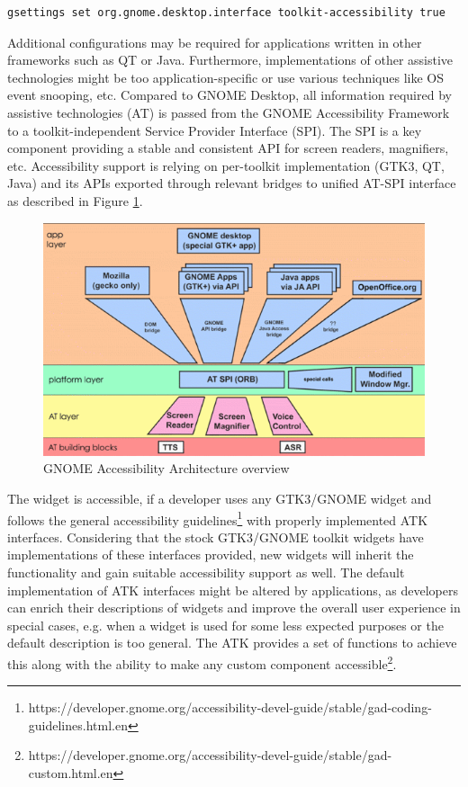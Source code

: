 \begin{lstlisting}[numbers=none,caption={Enabling accessibility via gsettings command},label={gsettings}]
gsettings set org.gnome.desktop.interface toolkit-accessibility true
\end{lstlisting}

Additional configurations may be required for applications written in other frameworks such as QT or Java. Furthermore, implementations of other assistive technologies might be too application-specific or use various techniques like OS event snooping, etc. Compared to GNOME Desktop, all information required by assistive technologies (AT) is passed from the GNOME Accessibility Framework to a toolkit-independent Service Provider Interface (SPI). The SPI is a key component providing a stable and consistent API for screen readers, magnifiers, etc. Accessibility support is relying on per-toolkit implementation (GTK3, QT, Java) and its APIs exported through relevant bridges to unified AT-SPI interface as described in Figure \ref{ATSPI_architecture}.

\begin{figure}[hbt]
	\centering
	\includegraphics[width=1\textwidth]{obrazky-figures/GNOME_desktop_Accessibility.png}
	\caption{GNOME Accessibility Architecture overview\cite{gnomeADG}}
	\label{ATSPI_architecture}
\end{figure}

The widget is accessible, if a developer uses any GTK3/GNOME widget and follows the general accessibility guidelines\footnote{https://developer.gnome.org/accessibility-devel-guide/stable/gad-coding-guidelines.html.en} with properly implemented ATK interfaces. Considering that the stock GTK3/GNOME toolkit widgets have implementations of these interfaces provided, new widgets will inherit the functionality and gain suitable accessibility support as well. The default implementation of ATK interfaces might be altered by applications, as developers can enrich their descriptions of widgets and improve the overall user experience in special cases, e.g. when a widget is used for some less expected purposes or the default description is too general. The ATK provides a set of functions to achieve this along with the ability to make any custom component accessible\footnote{https://developer.gnome.org/accessibility-devel-guide/stable/gad-custom.html.en}.\cite{accessibleWidgets}

